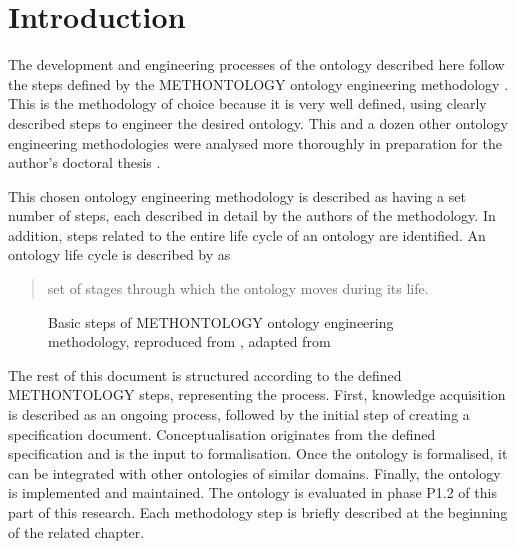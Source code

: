 \chapter*{Introduction}

The development and engineering processes of the ontology described here follow the steps defined by the METHONTOLOGY ontology engineering methodology \cite{fernandez-lopez1997METHONTOLOGYOntologicalArt, okresaduric2019OrganizationalModelingLargeScale}. This is the methodology of choice because it is very well defined, using clearly described steps to engineer the desired ontology. This and a dozen other ontology engineering methodologies were analysed more thoroughly in preparation for the author's doctoral thesis \cite{okresaduric2019OrganizationalModelingLargeScale}.

This chosen ontology engineering methodology is described as having a set number of steps,%
each described in detail by the authors of the methodology. In addition, steps related to the entire life cycle of an ontology are identified. An ontology life cycle is described by \citeauthor{iqbal2013AnalysisOntologyEngineering} as \blockquote[{\cite[p. 2997]{iqbal2013AnalysisOntologyEngineering}}]{ set of stages through which the ontology moves during its life.} 

\begin{figure}
    \resizebox{\linewidth}{!}{}
    \caption{Basic steps of METHONTOLOGY ontology engineering methodology, reproduced from \cite{okresaduric2019OrganizationalModelingLargeScale}, adapted from \cite{fernandez-lopez1997METHONTOLOGYOntologicalArt}}
    \label{fig:methontology steps}
\end{figure}

The rest of this document is structured according to the defined METHONTOLOGY steps, representing the  process. First, knowledge acquisition%
is described as an ongoing process, followed by the initial step of creating a specification document.%
Conceptualisation%
originates from the defined specification and is the input to formalisation.%
Once the ontology is formalised, it can be integrated%
with other ontologies of similar domains. Finally, the ontology is implemented and maintained.%
The ontology is evaluated in phase P1.2 of this part of this research.%
Each methodology step is briefly described at the beginning of the related chapter.